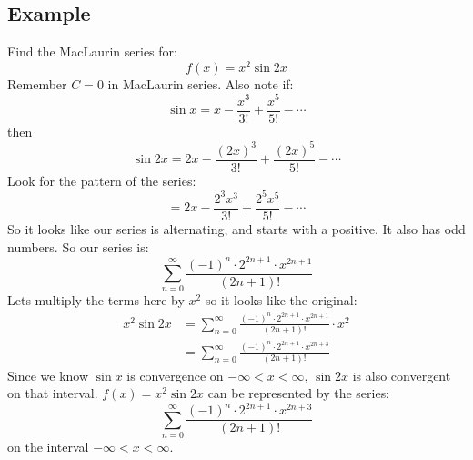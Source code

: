\documentclass{report}
\begin{document}
    \subsection{Example}
        Find the MacLaurin series for:
        \[f(x) = x^2 \sin 2x\]
        Remember \(C = 0\) in MacLaurin series.
        Also note if:
        \[\sin x = x - \frac{x^3}{3!} + \frac{x^5}{5!} - \cdots\]
        then
        \[\sin 2x = 2x - \frac{(2x)^3}{3!} + \frac{(2x)^5}{5!} - \cdots\]
        Look for the pattern of the series:
        \[= 2x - \frac{2^3 x^3}{3!} + \frac{2^5 x^5}{5!} - \cdots\]
        So it looks like our series is alternating, and starts with a positive. It also has odd numbers.
        So our series is:
        \[\sum_{n=0}^{\infty} \frac{(-1)^n \cdot 2^{2n+1} \cdot x^{2n+1}}{(2n+1)!}\]
        Lets multiply the terms here by \(x^2\) so it looks like the original:
        \begin{align*}
            x^2 \sin 2x
            &= \sum_{n=0}^{\infty} \frac{(-1)^n \cdot 2^{2n+1} \cdot x^{2n+1}}{(2n+1)!} \cdot x^2 \\
            &= \sum_{n=0}^{\infty} \frac{(-1)^n \cdot 2^{2n+1} \cdot x^{2n+3}}{(2n+1)!}
        \end{align*}
        Since we know \(\sin x\) is convergence on \(- \infty < x < \infty\), \(\sin 2x\) is also convergent on that interval.
        \(f(x) = x^2 \sin 2x\) can be represented by the series:
        \[\sum_{n=0}^{\infty} \frac{(-1)^n \cdot 2^{2n+1} \cdot x^{2n+3}}{(2n+1)!}\]
        on the interval \(- \infty < x < \infty\).
    
\end{document}
